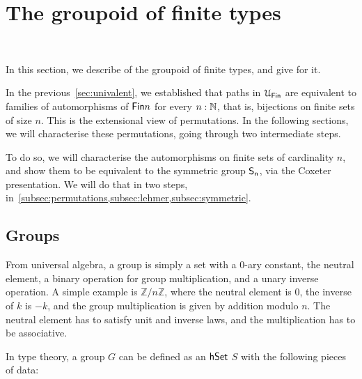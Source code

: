 \section{The groupoid of finite types}~\label{sec:finite}

In this section, we describe  of the groupoid of
finite types, and give  for it.



In the previous~\cref{sec:univalent}, we established that paths in $\UFin$ are equivalent to families of automorphisms
of $\Fin{n}$ for every $n:\mathbb{N}$, that is, bijections on finite sets of size $n$. This is the extensional view of
permutations. In the following sections, we will characterise these permutations, going through two intermediate steps.

To do so, we will characterise the automorphisms on finite sets of cardinality $n$, and show them to be equivalent to
the symmetric group $\Sn$, via the Coxeter presentation. We will do that in two steps,
in~\cref*{subsec:permutations,subsec:lehmer,subsec:symmetric}.


\subsection{Groups}

From universal algebra, a group is simply a set with a 0-ary constant, the neutral element, a binary operation for group
multiplication, and a unary inverse operation. A simple example is $\mathbb{Z}/n\mathbb{Z}$, where the neutral element
is 0, the inverse of $k$ is $-k$, and the group multiplication is given by addition modulo $n$. The neutral element has
to satisfy unit and inverse laws, and the multiplication has to be associative.

In type theory, a group $G$ can be defined as an $\mathsf{hSet}$ $S$ with the following pieces of data:

